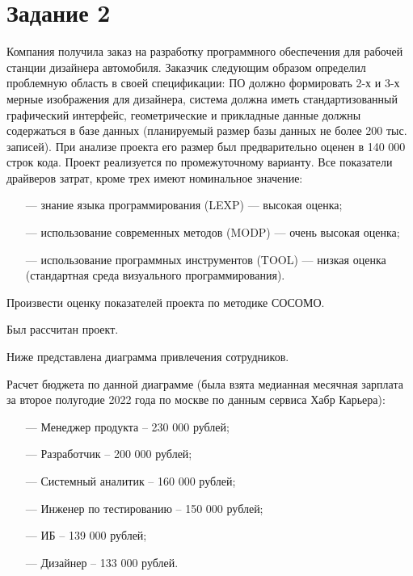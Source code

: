 \clearpage

\section{Задание 2}

Компания получила заказ на разработку программного обеспечения для рабочей станции дизайнера автомобиля. Заказчик следующим образом определил проблемную область в своей спецификации: ПО должно формировать 2-х и 3-х мерные изображения для дизайнера, система должна иметь стандартизованный графический интерфейс, геометрические и прикладные данные должны содержаться в базе данных (планируемый размер базы данных не более 200 тыс. записей).  При анализе проекта его размер был предварительно оценен в 140 000 строк кода. Проект реализуется по промежуточному варианту. Все показатели драйверов затрат, кроме трех имеют номинальное значение:
\begin{itemize}
    \item[---] знание языка программирования (LEXP) --- высокая оценка;
    \item[---] использование современных методов (MODP) --- очень высокая оценка;
    \item[---] использование программных инструментов (TOOL) --- низкая оценка (стандартная среда визуального программирования).
\end{itemize}

Произвести оценку показателей проекта по методике СОСОМО.

\clearpage

Был рассчитан проект.


Ниже представлена диаграмма привлечения сотрудников.


Расчет бюджета по данной диаграмме (была взята медианная месячная зарплата за второе полугодие 2022 года по москве по данным сервиса Хабр Карьера):

\begin{itemize}
    \item[---] Менеджер продукта – 230 000 рублей;
    \item[---] Разработчик – 200 000 рублей;
    \item[---] Системный аналитик – 160 000 рублей;
    \item[---] Инженер по тестированию – 150 000 рублей;
    \item[---] ИБ – 139 000 рублей;
    \item[---] Дизайнер – 133 000 рублей.
\end{itemize}

